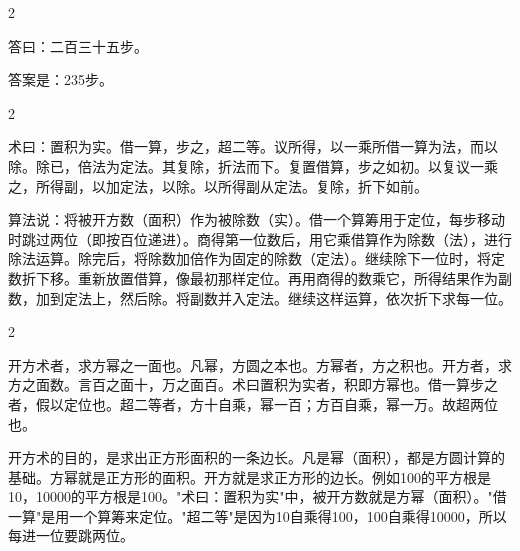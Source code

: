 \documentclass[11pt,a4paper]{article}
\begin{document}
\vspace{0.2cm}

\begin{paracol}{2}

\begin{answerbox}[\CJKfamily{rm}答 · 原文]
答曰：二百三十五步。
\end{answerbox}

\switchcolumn

\begin{answerbox}[白话文：答案]
答案是：235步。
\end{answerbox}

\end{paracol}

\vspace{0.2cm}

\begin{paracol}{2}

\begin{methodbox}
术曰：置积为实。借一算，步之，超二等。议所得，以一乘所借一算为法，而以除。除已，倍法为定法。其复除，折法而下。复置借算，步之如初。以复议一乘之，所得副，以加定法，以除。以所得副从定法。复除，折下如前。
\end{methodbox}

\switchcolumn

\begin{methodbox}
算法说：将被开方数（面积）作为被除数（实）。借一个算筹用于定位，每步移动时跳过两位（即按百位递进）。商得第一位数后，用它乘借算作为除数（法），进行除法运算。除完后，将除数加倍作为固定的除数（定法）。继续除下一位时，将定数折下移。重新放置借算，像最初那样定位。再用商得的数乘它，所得结果作为副数，加到定法上，然后除。将副数并入定法。继续这样运算，依次折下求每一位。
\end{methodbox}

\end{paracol}

\vspace{0.2cm}

\begin{paracol}{2}

\begin{commentarybox}
开方术者，求方幂之一面也。凡幂，方圆之本也。方幂者，方之积也。开方者，求方之面数。言百之面十，万之面百。术曰置积为实者，积即方幂也。借一算步之者，假以定位也。超二等者，方十自乘，幂一百；方百自乘，幂一万。故超两位也。
\end{commentarybox}

\switchcolumn

\begin{commentarybox}
开方术的目的，是求出正方形面积的一条边长。凡是幂（面积），都是方圆计算的基础。方幂就是正方形的面积。开方就是求正方形的边长。例如100的平方根是10，10000的平方根是100。"术曰：置积为实"中，被开方数就是方幂（面积）。"借一算"是用一个算筹来定位。"超二等"是因为10自乘得100，100自乘得10000，所以每进一位要跳两位。
\end{commentarybox}

\end{paracol}
\end{document}
